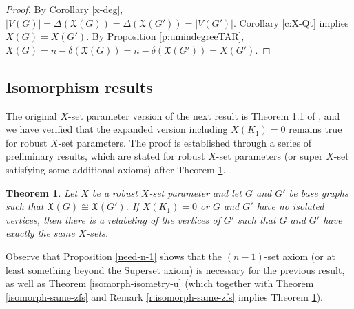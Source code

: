 \documentclass{article}
\def\blu{\color{blue}}
\numberwithin{figure}{section}
\numberwithin{table}{section}
\numberwithin{equation}{section}
\newtheorem{thm}{Theorem}[section]
\theoremstyle{definition}
\theoremstyle{definition}
\theoremstyle{definition}
\newcommand{\bpf}{\begin{proof}}
\newcommand{\epf}{\end{proof}\ms}
\newcommand{\ms}{\medskip}
\newcommand{\ol}{\overline}
\newcommand{\Xr}{X}
\newcommand{\xbar}{\ol X}
\newcommand{\xtar}{\mathfrak{X}}%
\begin{document}
{{\blu \bpf  By Corollary \ref{x-deg}, $|V(G)|=\Delta(\xtar(G))=\Delta(\xtar(G'))=|V(G')|$. 
Corollary \ref{c:X-Qt} implies $X(G)=X(G')$. By Proposition \ref{p:umindegreeTAR}, $\xbar(G)=n-\delta(\xtar(G))=n-\delta(\xtar(G'))=\xbar(G')$. 
\epf}



\subsection{Isomorphism results}

 The original $X$-set parameter version of the  next result is Theorem 1.1 of \cite{XTARiso}, and we have verified  that the expanded version including $X(K_1)=0$ remains true for robust $\Xr$-set parameters.  The proof is established through a series of preliminary results, which are stated for robust $\Xr$-set parameters (or super $X$-set satisfying some additional axioms) after Theorem \ref{t:main}.  

\begin{thm}\label{t:main} Let $\Xr$ be a robust $X$-set parameter  and let $G$ and $G'$ be base graphs  such that $\xtar(G)\cong\xtar(G')$.  If $X(K_1)=0$ or $G$ and $G'$ have no isolated vertices, then there is a relabeling of the vertices of $G'$ such that $G$ and $G'$ have exactly the same $\Xr$-sets.  
\end{thm}

Observe that Proposition \ref{need-n-1}  shows that the $(n-1)$-set axiom (or at least something beyond the Superset  axiom)
is necessary for the previous result, as well as Theorem \ref{isomorph-isometry-u}  (which together with Theorem \ref{isomorph-same-zfs}  and Remark \ref{r:isomorph-same-zfs} implies Theorem \ref{t:main}).  


}
\end{document}
